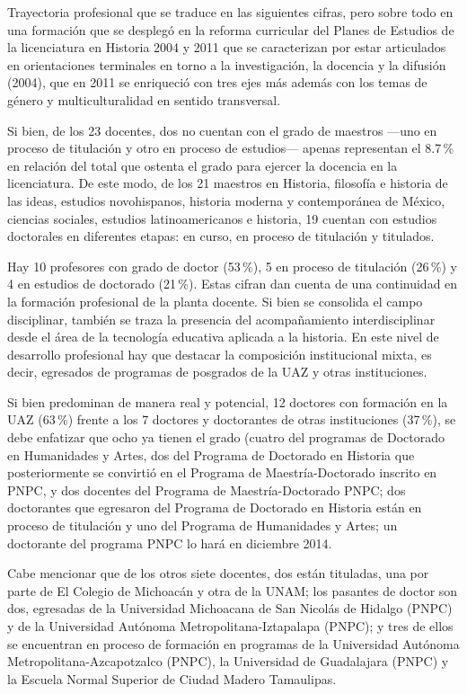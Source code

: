 Trayectoria profesional que se traduce en las siguientes cifras, pero sobre
todo en una formación que se desplegó en la reforma curricular del Planes
de Estudios de la licenciatura en Historia 2004 y 2011 que se caracterizan
por estar articulados en orientaciones terminales  en torno a la
investigación, la docencia y la difusión (2004), que en 2011 se enriqueció
con  tres ejes más además con los temas de género y multiculturalidad en
sentido transversal. 


Si bien, de los 23 docentes, dos no cuentan con el grado de maestros ---uno en
proceso de titulación y otro en proceso de estudios--- apenas representan el
8.7\,\% en relación del total que ostenta el grado para ejercer la docencia
en la licenciatura. De este modo, de los 21 maestros en Historia, filosofía
e historia de las ideas, estudios novohispanos, historia moderna y
contemporánea de México, ciencias sociales, estudios latinoamericanos e
historia, 19 cuentan con estudios doctorales en diferentes etapas: en
curso, en proceso de titulación y titulados. 

 
Hay 10 profesores con grado de doctor (53\,\%), 5 en proceso de titulación
(26\,\%) y 4 en estudios de doctorado (21\,\%). Estas cifran dan cuenta de una
continuidad en la formación profesional de la planta docente. Si bien se
consolida el campo disciplinar,  también se traza la presencia del
acompañamiento interdisciplinar desde el área de la tecnología educativa
aplicada a la historia. En este nivel de desarrollo profesional hay que
destacar la composición institucional mixta, es decir, egresados de
programas de posgrados de la UAZ  y otras instituciones. 


Si bien predominan de manera real y potencial, 12 doctores con
formación en la UAZ (63\,\%) frente a los 7 doctores y doctorantes  de otras
instituciones (37\,\%),  se debe enfatizar que ocho ya tienen el grado 
(cuatro del programas de Doctorado en Humanidades y Artes,  dos del Programa
de Doctorado en Historia que posteriormente se convirtió en el Programa de
Maestría-Doctorado inscrito en PNPC, y dos  docentes del Programa de
Maestría-Doctorado PNPC; dos doctorantes que egresaron del Programa de
Doctorado en Historia están en proceso de titulación y uno del Programa de
Humanidades y Artes; un doctorante del programa PNPC  lo hará en diciembre
2014. 


Cabe mencionar que de los otros siete docentes, dos están tituladas, una
por parte de El Colegio de Michoacán y otra de la UNAM; los pasantes de
doctor son dos, egresadas de la Universidad Michoacana de San Nicolás de
Hidalgo (PNPC) y de la Universidad Autónoma Metropolitana-Iztapalapa
(PNPC); y tres de ellos se encuentran en proceso de formación en programas
de la Universidad Autónoma Metropolitana-Azcapotzalco (PNPC), la
Universidad de Guadalajara (PNPC) y la Escuela Normal Superior de Ciudad
Madero Tamaulipas.


